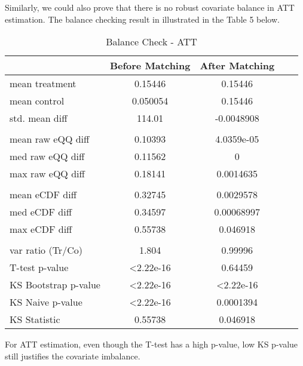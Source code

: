 \documentclass{article}[12pt]
\begin{document}
Similarly, we could also prove that there is no robust covariate balance in ATT estimation. The balance checking result in illustrated in the Table 5 below. \par
\begin{table}[htbp]
    \centering
    \caption{Balance Check - ATT}
    \label{tab: Balance Check - ATT}
    \begin{tabular}{lcccc}
        \toprule
         & \textbf{Before Matching} & \textbf{After Matching}  \\ 
        \midrule
         mean treatment & 0.15446 & 0.15446  \\
         mean control & 0.050054 & 0.15446  \\
         std. mean diff & 114.01 & -0.0048908 \\
         \\
         mean raw eQQ diff & 0.10393 & 4.0359e-05 \\
         med raw eQQ diff & 0.11562 & 0 \\
         max raw eQQ diff & 0.18141 & 0.0014635  \\
         \\
         mean eCDF diff & 0.32745 & 0.0029578 \\
         med eCDF diff & 0.34597 & 0.00068997 \\
         max eCDF diff & 0.55738 & 0.046918 \\
         \\
         var ratio (Tr/Co) & 1.804 & 0.99996 \\
         T-test p-value & \textless 2.22e-16 & 0.64459 \\
         KS Bootstrap p-value & \textless 2.22e-16 & \textless 2.22e-16 \\
         KS Naive p-value & \textless 2.22e-16 & 0.0001394 \\
         KS Statistic &  0.55738 & 0.046918 \\        
        \bottomrule
    \end{tabular}
\end{table}
For ATT estimation, even though the T-test has a high p-value, low KS p-value still justifies the covariate imbalance. \par
\end{document}
